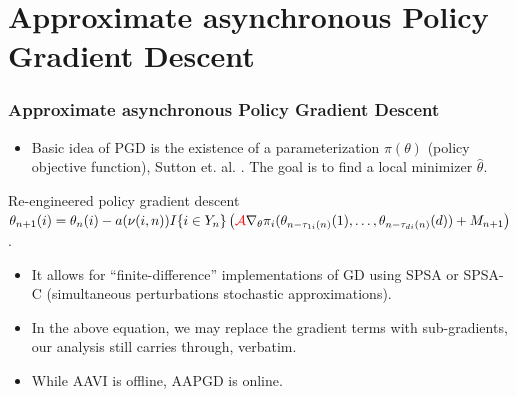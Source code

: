 \documentclass{beamer}
\begin{document}
\section{Approximate asynchronous Policy Gradient Descent}
\begin{frame}
 \frametitle{Approximate asynchronous Policy Gradient Descent}
 \begin{itemize}
  \item Basic idea of PGD is the existence of a parameterization $\pi(\theta)$ 
  {\color{purple}(policy objective function)}, Sutton et. al. \cite{p9}. 
  The goal is to find
  a local minimizer $\hat{\theta}$.
  \end{itemize}
  \begin{block}{Re-engineered policy gradient descent}{\footnotesize
   $\theta_{n+1}(i) = \theta_n (i)  - a(\nu(i,n)) I\{ i \in Y_n\} \left(
    {\color{red}\mathcal{A}}\nabla_\theta \pi_i(\theta_{n - \tau_{1i}(n)}(1), \ldots, 
\theta_{n - \tau_{di}(n)}(d)) + M_{n+1} \right)
    $.}
  \end{block}
  \begin{itemize}
   \item It allows for ``finite-difference'' implementations of GD using SPSA or SPSA-C
   (simultaneous perturbations stochastic approximations).
   \item In the above equation, we may replace the {\color{purple}gradient terms} with {\color{purple} sub-gradients}, 
   our analysis still carries through, verbatim.
    \item {\color{purple}While AAVI is offline, AAPGD is online}.
  \end{itemize}
\end{frame}
% 
\end{document}
